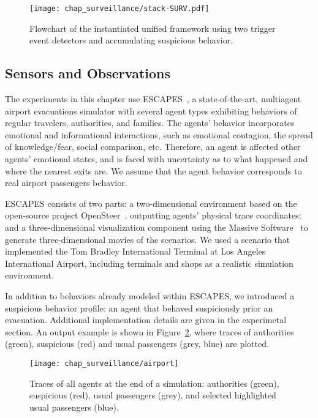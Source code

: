 \begin{figure}[!ht]
\centering
\texttt{[image: chap\_surveillance/stack-SURV.pdf]}
\caption{Flowchart of the instantiated unified framework using two trigger event detectors and accumulating suspicious behavior.}
\label{fig:architecture-fupr}
\end{figure}


\subsection{Sensors and Observations}

The experiments in this chapter use ESCAPES~\citep{Tsai2011}, a state-of-the-art, multiagent airport evacuations simulator with several agent types exhibiting behaviors of regular travelers, authorities, and families. The agents' behavior incorporates emotional and informational interactions, such as emotional contagion, the spread of knowledge/fear, social comparison, etc. Therefore, an agent is affected other agents' emotional states, and is faced with uncertainty as to what happened and where the nearest exits are. We assume that the agent behavior corresponds to real airport passengers behavior.

ESCAPES consists of two parts: a two-dimensional environment based on the open-source project OpenSteer~\citep{opensteer}, outputting agents' physical trace coordinates; and a three-dimensional visualization component using the Massive Software~\citep{massive} to generate three-dimensional movies of the scenarios. We used a scenario that implemented the Tom Bradley International Terminal at Los Angeles International Airport, including terminals and shops as a realistic simulation environment. 

In addition to behaviors already modeled within ESCAPES, we introduced a suspicious behavior profile: an agent that behaved suspiciously prior an evacuation. Additional implementation details  are given in the experimetal section. An output example is shown in Figure~\ref{fig:airport:traces}, where traces of authorities (green), suspicious (red) and usual passengers (grey, blue) are plotted.
\begin{figure}[!ht]
\centering
\texttt{[image: chap\_surveillance/airport]}
\caption{Traces of all agents at the end of a simulation: authorities (green), suspicious (red), usual passengers (grey), and selected highlighted usual passengers (blue).}
\label{fig:airport:traces}
\end{figure}

